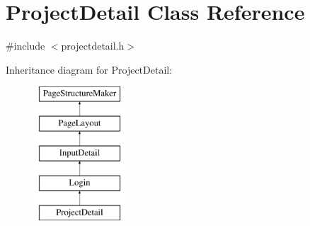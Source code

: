 \hypertarget{classProjectDetail}{\section{Project\-Detail Class Reference}
\label{classProjectDetail}
}


{\ttfamily \#include $<$projectdetail.\-h$>$}

Inheritance diagram for Project\-Detail\-:\begin{figure}[H]
\begin{center}
\leavevmode
\includegraphics[height=5.000000cm]{classProjectDetail}
\end{center}
\end{figure}
